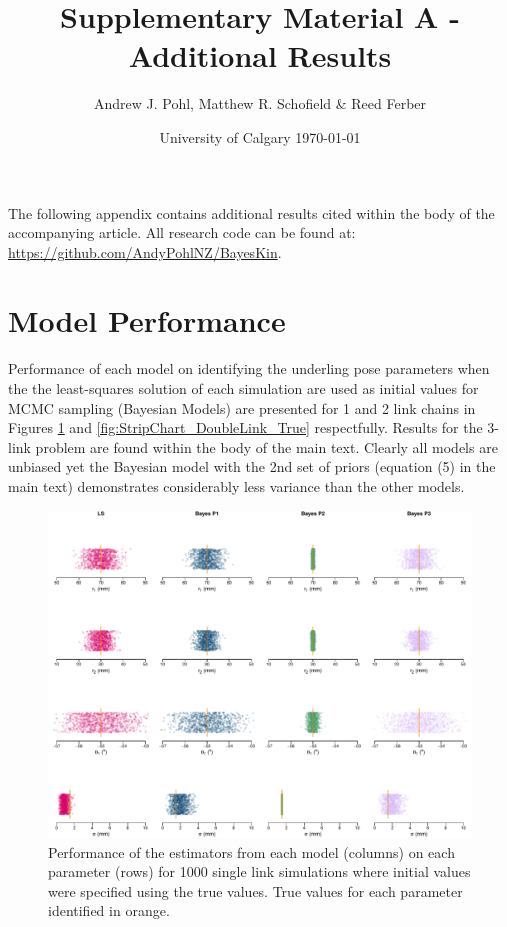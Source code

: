 \documentclass{article}
\title{Supplementary Material A - Additional Results}
\author{Andrew J. Pohl, Matthew R. Schofield \&  Reed Ferber}
\date{University of Calgary \today}
\begin{document}
\linenumbers
\maketitle 

\doublespacing

The following appendix contains additional results cited within the body of the accompanying article.  All research code can be found at: \href{https://github.com/AndyPohlNZ/BayesKin}{https://github.com/AndyPohlNZ/BayesKin}.
\section{Model Performance}
Performance of each model on identifying the underling pose parameters when the the least-squares solution of each simulation are used as initial values for MCMC sampling (Bayesian Models) are presented for 1 and 2 link chains in Figures \ref{fig:StripChart_SingleLink_True} and \ref{fig:StripChart_DoubleLink_True} respectfully. Results for the 3-link problem are found within the body of the main text. Clearly all models are unbiased yet the Bayesian model with the 2nd set of priors (equation (5) in the main text) demonstrates considerably less variance than the other models.

\begin{figure}
\centering
\includegraphics[width=\textwidth]{./Figures/SingleLink_StripChart.pdf}
\caption{Performance of the estimators from each model (columns) on each parameter (rows) for 1000 single link simulations where initial values were specified using the true values.  True values for each parameter identified in orange.}
\label{fig:StripChart_SingleLink_True}
\end{figure}
\end{document}
